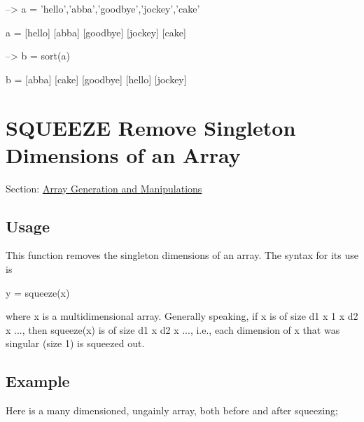 \begin{DoxyVerbInclude}
--> a = {'hello','abba','goodbye','jockey','cake'}

a = 
 [hello] [abba] [goodbye] [jockey] [cake] 

--> b = sort(a)

b = 
 [abba] [cake] [goodbye] [hello] [jockey] 
\end{DoxyVerbInclude}
 \hypertarget{array_squeeze}{}\section{S\-Q\-U\-E\-E\-Z\-E Remove Singleton Dimensions of an Array}\label{array_squeeze}
Section\-: \hyperlink{sec_array}{Array Generation and Manipulations} \hypertarget{vtkwidgets_vtkxyplotwidget_Usage}{}\subsection{Usage}\label{vtkwidgets_vtkxyplotwidget_Usage}
This function removes the singleton dimensions of an array. The syntax for its use is \begin{DoxyVerb}   y = squeeze(x)
\end{DoxyVerb}
 where {\ttfamily x} is a multidimensional array. Generally speaking, if {\ttfamily x} is of size {\ttfamily d1 x 1 x d2 x ...}, then {\ttfamily squeeze(x)} is of size {\ttfamily d1 x d2 x ...}, i.\-e., each dimension of {\ttfamily x} that was singular (size 1) is squeezed out. \hypertarget{variables_struct_Example}{}\subsection{Example}\label{variables_struct_Example}
Here is a many dimensioned, ungainly array, both before and after squeezing;



